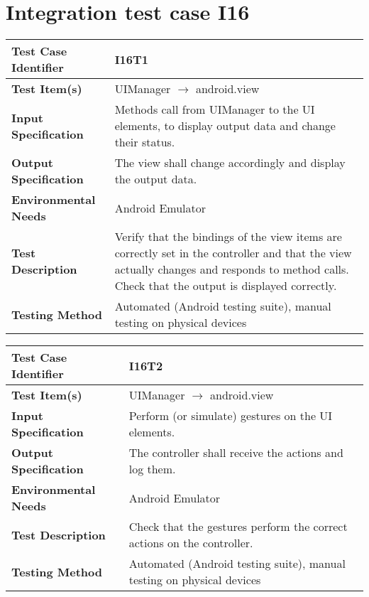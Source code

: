 \vspace{2em}

\section{Integration test case I16}

\begin{tabular}{l p{}}
    \hline
    \textbf{Test Case Identifier} & I16T1\\
    \hline
    \textbf{Test Item(s)} & UIManager $\rightarrow$ android.view \\
    \hline
    \textbf{Input Specification} & Methods call from UIManager to the UI elements, to display output data and change their status.\\
    \hline
    \textbf{Output Specification} & The view shall change accordingly and display the output data.\\
    \hline
    \textbf{Environmental Needs} & Android Emulator \\
    \hline
    \textbf{Test Description} & Verify that the bindings of the view items are correctly set in the controller and that the view actually changes and responds to method calls. Check that the output is displayed correctly.\\
    \hline
    \textbf{Testing Method} & Automated (Android testing suite), manual testing on physical devices \\
    \hline
\end{tabular}

\vspace{2em}

\noindent\begin{tabular}{l p{}}
    \hline
    \textbf{Test Case Identifier} & I16T2\\
    \hline
    \textbf{Test Item(s)} & UIManager $\rightarrow$ android.view \\
    \hline
    \textbf{Input Specification} & Perform (or simulate) gestures on the UI elements.\\
    \hline
    \textbf{Output Specification} & The controller shall receive the actions and log them. \\
    \hline
    \textbf{Environmental Needs} & Android Emulator \\
    \hline
    \textbf{Test Description} & Check that the gestures perform the correct actions on the controller.\\
    \hline
    \textbf{Testing Method} & Automated (Android testing suite), manual testing on physical devices \\
    \hline
\end{tabular}

